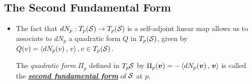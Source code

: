 \documentclass[11pt]{article}
\begin{document}
\subsection{The Second Fundamental Form}
\begin{itemize}
\item The fact that $dN_p: T_{p}({\mathcal S}) \rightarrow T_p({\mathcal S})$ is a self-adjoint linear map allows us to associate to $dN_p$ a quadratic form $Q$ in $T_p({\mathcal S})$, given by $Q(v) = \left\langle dN_{p}(v)\,,\, v \right\rangle, v \in T_{p}({\mathcal S})$. 
\begin{definition}
 The \emph{quadratic form} $\Pi_{p}$ defined in \underline{$T_{p}{\mathcal S}$} by $\Pi_{p}(\boldsymbol{v}) = -\left\langle dN_{p}(\boldsymbol{v})\,,\, \boldsymbol{v} \right\rangle$ is called the \underline{\emph{\textbf{second fundamental form}}} of ${\mathcal S}$ at $p$. 
\end{definition}


\end{itemize}
\end{document}
